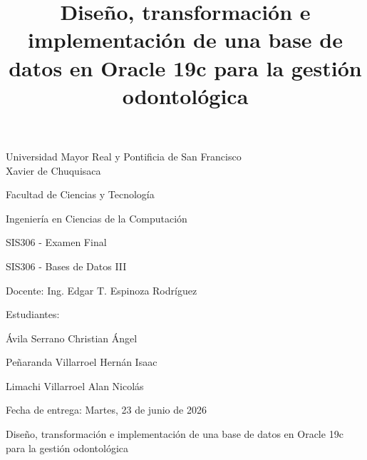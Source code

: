 \documentclass[man,12pt,floatsintext]{apa7}
\title{Diseño, transformación e implementación de una base de datos en Oracle 19c para la gestión odontológica}
\begin{document}
\nocite{*}

\thispagestyle{empty}
\begin{center}
  {\Large Universidad Mayor Real y Pontificia de San Francisco\\
    Xavier de Chuquisaca\par}

  \vspace{0.5cm}
  {\large Facultad de Ciencias y Tecnología\par}
  {\large Ingeniería en Ciencias de la Computación\par}

  \vspace{1.2cm}
  {\large SIS306 - Examen Final\par}
  {\large SIS306 - Bases de Datos III\par}

  \vspace{1.2cm}
  {\large Docente: Ing. Edgar T. Espinoza Rodríguez\par}

  \vspace{1.2cm}
  {\large Estudiantes:\par}
  {\large Ávila Serrano Christian Ángel\par}
  {\large Peñaranda Villarroel Hernán Isaac\par}
  {\large Limachi Villarroel Alan Nicolás\par}

  \vspace{1.2cm}
  {\large Fecha de entrega: Martes, 23 de junio de 2026\par}

  \vfill
  {\large Diseño, transformación e implementación de una base de datos en Oracle 19c para la gestión odontológica\par}
\end{center}

\clearpage
\setcounter{page}{1}














\clearpage
\printbibliography

\appendix


\end{document}
